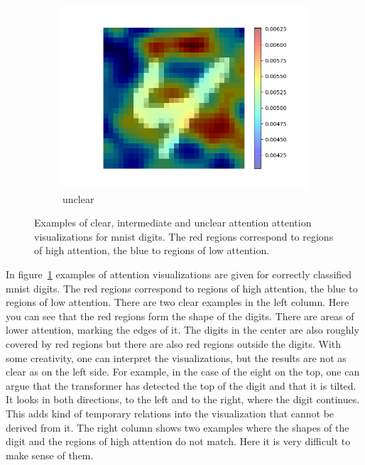 \documentclass[a4paper]{scrartcl}
\begin{document}
\begin{figure}[btp]
\begin{subfigure}[t]{0.3\textwidth}
            \includegraphics[width=\textwidth]{img/plots/attention_visualization_bad_2}
            \caption{unclear}
        \end{subfigure}
        \caption[Examples of clear and unclear attention visualizations for mnist digits]{Examples of clear, intermediate and unclear attention attention visualizations for mnist digits. The red regions correspond to regions of high attention, the blue to regions of low attention.}
        \label{fig:attention-visualization}
    \end{figure}

    In figure~\ref{fig:attention-visualization} examples of attention visualizations are given for correctly classified mnist digits.
    The red regions correspond to regions of high attention, the blue to regions of low attention.
    There are two clear examples in the left column.
    Here you can see that the red regions form the shape of the digits.
    There are areas of lower attention, marking the edges of it.
    The digits in the center are also roughly covered by red regions but there are also red regions outside the digits.
    With some creativity, one can interpret the visualizations, but the results are not as clear as on the left side.
    For example, in the case of the eight on the top, one can argue that the transformer has detected the top of the digit and that it is tilted.
    It looks in both directions, to the left and to the right, where the digit continues.
    This adds kind of temporary relations into the visualization that cannot be derived from it.
    The right column shows two examples where the shapes of the digit and the regions of high attention do not match.
    Here it is very difficult to make sense of them.
\end{document}
